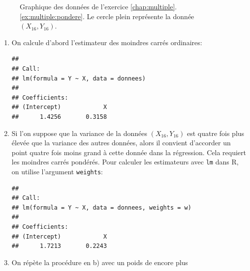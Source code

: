 \begin{solution}{3.17}
\begin{figure}
\begin{knitrout}
\end{knitrout}
      \caption{Graphique des données de l'exercice
        \ref{chap:multiple}.\ref{ex:multiple:pondere}. Le cercle plein
        représente la donnée $(X_{16}, Y_{16})$.}
      \label{fig:multiple:pondere}
    \end{figure}
    \begin{enumerate}
    \item On calcule d'abord l'estimateur des moindres carrés ordinaires:
\begin{knitrout}
\color{fgcolor}\begin{kframe}
\begin{alltt}
 \hlkwb{<-}  \hlopt{~}   
\end{alltt}
\begin{verbatim}
##
## Call:
## lm(formula = Y ~ X, data = donnees)
##
## Coefficients:
## (Intercept)            X
##      1.4256       0.3158
\end{verbatim}
\end{kframe}
\end{knitrout}
    \item Si l'on suppose que la variance de la données $(X_{16},
      Y_{16})$ est quatre fois plus élevée que la variance des autres
      données, alors il convient d'accorder un point quatre fois moins
      grand à cette donnée dans la régression. Cela requiert les
      moindres carrés pondérés. Pour calculer les estimateurs avec
      \texttt{lm} dans \textsf{R}, on utilise l'argument
      \texttt{weights}:
\begin{knitrout}
\color{fgcolor}\begin{kframe}
\begin{alltt}
 \hlkwb{<-} \hlstd{(}\hlstd{,} 
\hlstd{w[}\hlstd{]} \hlkwb{<-} 
 \hlkwb{<-}   
\end{alltt}
\begin{verbatim}
##
## Call:
## lm(formula = Y ~ X, data = donnees, weights = w)
##
## Coefficients:
## (Intercept)            X
##      1.7213       0.2243
\end{verbatim}
\end{kframe}
\end{knitrout}
    \item On répète la procédure en b) avec un poids de encore plus

\end{enumerate}
\end{solution}
